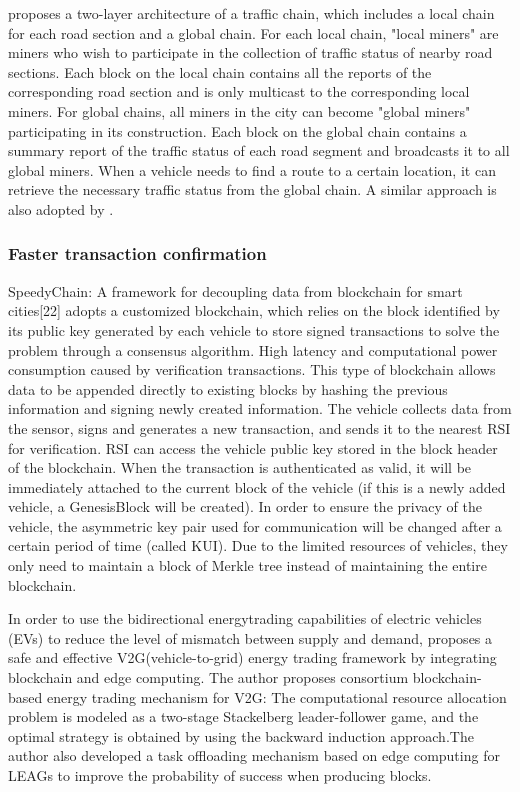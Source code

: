\cite{ref74} proposes a two-layer architecture of a traffic chain, which includes a local chain for each road section and a global chain. For each local chain, "local miners" are miners who wish to participate in the collection of traffic status of nearby road sections. Each block on the local chain contains all the reports of the corresponding road section and is only multicast to the corresponding local miners. For global chains, all miners in the city can become "global miners" participating in its construction. Each block on the global chain contains a summary report of the traffic status of each road segment and broadcasts it to all global miners. When a vehicle needs to find a route to a certain location, it can retrieve the necessary traffic status from the global chain. A similar approach is also adopted by \cite{ref82}.

\subsubsection{Faster transaction confirmation}
SpeedyChain: A framework for decoupling data from blockchain for smart cities[22] adopts a customized blockchain, which relies on the block identified by its public key generated by each vehicle to store signed transactions to solve the problem through a consensus algorithm. High latency and computational power consumption caused by verification transactions. This type of blockchain allows data to be appended directly to existing blocks by hashing the previous information and signing newly created information. The vehicle collects data from the sensor, signs and generates a new transaction, and sends it to the nearest RSI for verification. RSI can access the vehicle public key stored in the block header of the blockchain. When the transaction is authenticated as valid, it will be immediately attached to the current block of the vehicle (if this is a newly added vehicle, a GenesisBlock will be created). In order to ensure the privacy of the vehicle, the asymmetric key pair used for communication will be changed after a certain period of time (called KUI). Due to the limited resources of vehicles, they only need to maintain a block of Merkle tree instead of maintaining the entire blockchain.

In order to use the bidirectional energytrading capabilities of electric vehicles (EVs) to reduce the level of mismatch between supply and demand, \cite{ref41} proposes a safe and effective V2G(vehicle-to-grid) energy trading framework by integrating blockchain and edge computing. The author proposes  consortium blockchain-based energy trading mechanism for V2G: The computational resource allocation problem is modeled as a two-stage Stackelberg leader-follower game, and the optimal strategy is obtained by using the backward induction approach.The author also developed a task offloading mechanism based on edge computing for LEAGs to improve the probability of success when producing blocks.

